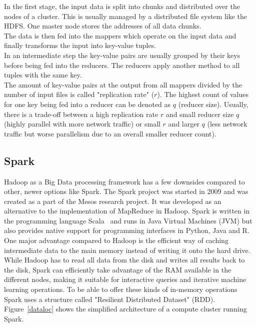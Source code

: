 \noindent In the first stage, the input data is split into chunks and distributed over the nodes of a cluster. This is usually managed by a distributed file system like the HDFS. One master node stores the addresses of all data chunks.\\
The data is then fed into the mappers which operate on the input data and finally transforms the input into key-value tuples.\\
In an intermediate step the key-value pairs are usually grouped by their keys before being fed into the reducers. The reducers apply another method to all tuples with the same key.\\
The amount of key-value pairs at the output from all mappers divided by the number of input files is called "replication rate" ($r$). The highest count of values for one key being fed into a reducer can be denoted as $q$ (reducer size). Usually, there is a trade-off between a high replication rate $r$ and small reducer size $q$ (highly parallel with more network traffic) or small $r$ and larger $q$ (less network traffic but worse parallelism due to an overall smaller reducer count).

\subsection{Spark}\label{sparksec}

Hadoop as a Big Data processing framework has a few downsides compared to other, newer options like Spark. The Spark project was started in 2009 and was created as a part of the Mesos research project. It was developed as an alternative to the implementation of MapReduce in Hadoop. Spark is written in the programming language Scala~\cite{scalalang} and runs in Java Virtual Machines (JVM) but also provides native support for programming interfaces in Python, Java and R. One major advantage compared to Hadoop is the efficient way of caching intermediate data to the main memory instead of writing it onto the hard drive. While Hadoop has to read all data from the disk and writes all results back to the disk, Spark can efficiently take advantage of the RAM available in the different nodes, making it suitable for interactive queries and iterative machine learning operations. To be able to offer these kinds of in-memory operations Spark uses a structure called "Resilient Distributed Dataset" (RDD).~\cite[p. 13]{sparkbook1}\\ 
Figure~\ref{dataloc} shows the simplified architecture of a compute cluster running Spark. 

